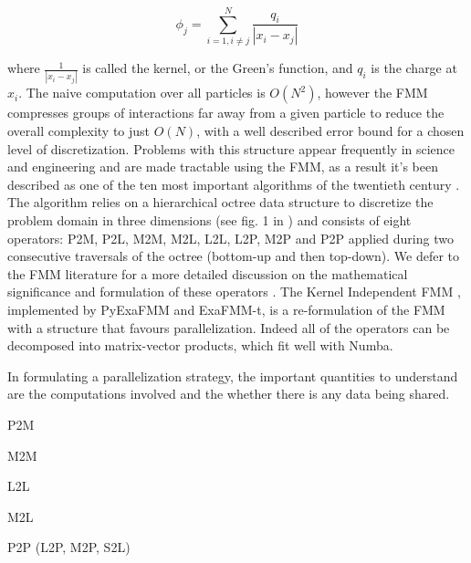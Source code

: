 \documentclass{IEEEcsmag}
\begin{document}
\begin{equation}
    \phi_j = \sum_{i=1, i \neq j}^{N} \frac{q_i}{| x_i-x_j |}
    \label{eq:laplace_kernel}
\end{equation}

where $\frac{1}{| x_i-x_j|}$ is called the kernel, or the Green's function, and $q_i$ is the charge at $x_i$. The naive computation over all particles is $O(N^2)$, however the FMM compresses groups of interactions far away from a given particle to reduce the overall complexity to just $O(N)$, with a well described error bound for a chosen level of discretization. Problems with this structure appear frequently in science and engineering and are made tractable using the FMM, as a result it's been described as one of the ten most important algorithms of the twentieth century \cite{Cipra2000}. The algorithm relies on a hierarchical octree data structure to discretize the problem domain in three dimensions (see fig. 1 in \cite{Sundar2007}) and consists of eight operators: P2M, P2L, M2M, M2L, L2L, L2P, M2P and P2P applied during two consecutive traversals of the octree (bottom-up and then top-down). We defer to the FMM literature for a more detailed discussion on the mathematical significance and formulation of these operators \cite{Greengard1987}. The Kernel Independent FMM \cite{Ying2004}, implemented by PyExaFMM and ExaFMM-t, is a re-formulation of the FMM with a structure that favours parallelization. Indeed all of the operators can be decomposed into matrix-vector products, which fit well with Numba.

In formulating a parallelization strategy, the important quantities to understand are the computations involved and the whether there is any data being shared.

P2M

M2M

L2L

M2L

P2P (L2P, M2P, S2L)


\end{document}
